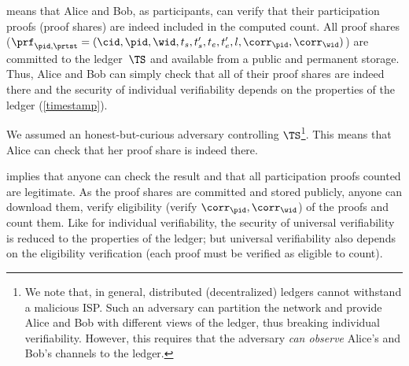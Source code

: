  means that Alice and Bob, as participants, can verify 
that their participation proofs (\ie proof shares) are indeed included in the 
computed count.
All proof shares (\ie \(\prf_{\pid, \prtst} = (\cid, \pid, \wid, t_s, t_s', 
  t_e, t_e', l, \corr_\pid, \corr_\wid)\)) are committed to the ledger~\(\TS\) 
and available from a public and permanent storage.
Thus, Alice and Bob can simply check that all of their proof shares are indeed 
there and the security of individual verifiability depends on the properties of 
the ledger (\cf \cref{timestamp}).

We assumed an honest-but-curious adversary controlling \(\TS\)\footnote{%
  We note that, in general, distributed (decentralized) ledgers cannot 
  withstand a malicious \ac{ISP}.
  Such an adversary can partition the network and provide Alice and Bob with 
  different views of the ledger, thus breaking individual verifiability.
  However, this requires that the adversary \emph{can observe} Alice's and 
  Bob's channels to the ledger.
}.
This means that Alice can check that her proof share is indeed there.

 implies that anyone can check the result and that all 
participation proofs counted are legitimate.
As the proof shares are committed and stored publicly, anyone can
download them, verify eligibility (\ie verify \(\corr_\pid,
\corr_{\wid}\)) of the proofs and count them.
Like for individual verifiability, the security of universal verifiability is 
reduced to the properties of the ledger; but universal verifiability also 
depends on the eligibility verification (each proof must be verified as 
eligible to count).
